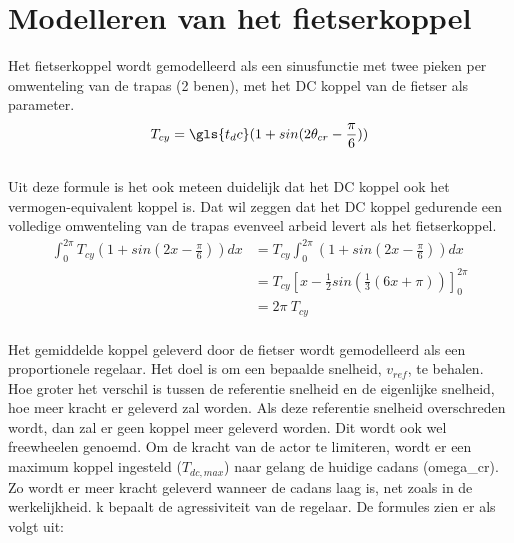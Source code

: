 \section{Modelleren van het fietserkoppel}
Het fietserkoppel wordt gemodelleerd als een sinusfunctie met twee pieken per omwenteling van de trapas (2 benen), met het DC koppel van de fietser als parameter.
\\
\begin{gather*}
 T_{cy} = \gls{t_dc}(1+sin(2\theta_{cr}-\frac{\pi}{6}))
\end{gather*}
\\
Uit deze formule is het ook meteen duidelijk dat het DC koppel ook het vermogen-equivalent koppel is. Dat wil zeggen dat het DC koppel gedurende een volledige omwenteling van de trapas evenveel arbeid levert als het fietserkoppel.
\\
\begin{align*}
\int_{0}^{2\pi} T_{cy}(1+sin(2x-\frac{\pi}{6})) dx &= T_{cy} \int_{0}^{2\pi}(1+sin(2x-\frac{\pi}{6})) dx\\
&= T_{cy} \left[x-\frac{1}{2}sin(\frac{1}{3}(6x+\pi))\right]_0^{2\pi}\\
&= 2\pi \ T_{cy}
\end{align*}
\\
\noindent
Het gemiddelde koppel geleverd door de fietser wordt gemodelleerd als een proportionele regelaar. Het doel is om een bepaalde snelheid, $v_{ref}$, te behalen. Hoe groter het verschil is tussen de referentie snelheid en de eigenlijke snelheid, hoe meer kracht er geleverd zal worden. Als deze referentie snelheid overschreden wordt, dan zal er geen koppel meer geleverd worden. Dit wordt ook wel freewheelen genoemd. Om de kracht van de actor te limiteren, wordt er een maximum koppel ingesteld ($T_{dc,max}$) naar gelang de huidige cadans (\gls{omega_cr}). Zo wordt er meer kracht geleverd wanneer de cadans laag is, net zoals in de werkelijkheid. \gls{k} bepaalt de agressiviteit van de regelaar. De formules zien er als volgt uit:

